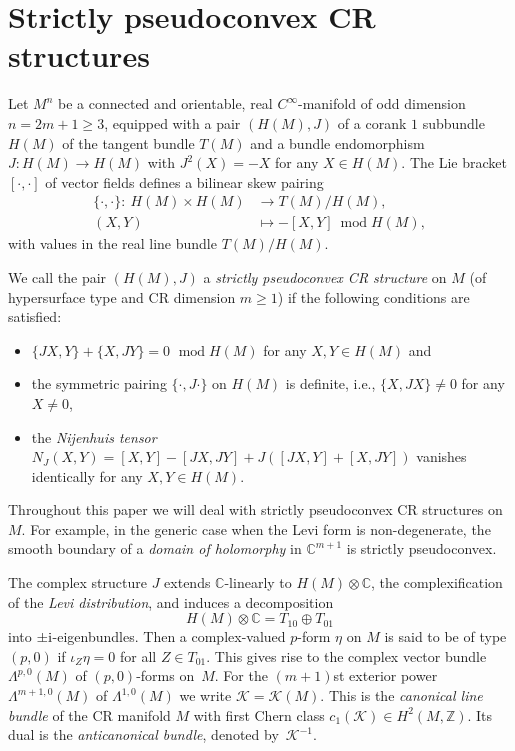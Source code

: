 \documentclass[pdftex]{sigma}
\numberwithin{equation}{section}
\newcommand{\ZZ}{\mathbb{Z}}
\newcommand{\CC}{\mathbb{C}}
\begin{document}
\section{Strictly pseudoconvex CR structures} \label{Sec2}

Let $M^n$ be a connected and orientable, real $C^\infty$-manifold of odd dimension $n=2m+1\geq 3$, equipped with a pair $(H(M),J)$
of a corank $1$ subbundle $H(M)$ of the tangent bundle $T(M)$ and a bundle endomorphism $J\colon H(M)\to H(M)$
with $J^2(X)=-X$ for any $X\in H(M)$. The Lie bracket $[\cdot,\cdot]$ of vector fields defines a bilinear skew pairing
\begin{align*}\{\cdot,\cdot\}\colon \ H(M)\times H(M) &\to T(M)/H(M),\\
 (X,Y)&\mapsto -[X,Y]\ \operatorname{mod} H(M),
\end{align*}
with values in the real line bundle $T(M)/H(M)$.

We call the pair $(H(M),J)$ a {\em strictly pseudoconvex CR structure} on $M$ (of hypersurface type and CR dimension $m\geq 1$)
if the following conditions are satisfied:
\begin{itemize}\itemsep=0pt
\item $\{JX,Y\}+\{X,JY\}=0$ $\operatorname{mod} H(M)$ for any $X,Y\in H(M)$ and
\item the symmetric pairing $\{\cdot,J\cdot\}$ on $H(M)$ is definite, i.e., $\{X,JX\}\neq 0$ for any $X\neq 0$,
\item the {\em Nijenhuis tensor} $N_J(X,Y)= [X,Y]-[JX,JY]+J([JX,Y]+[X,JY])$ vanishes identically for any $X,Y\in H(M)$.
\end{itemize}
Throughout this paper we will deal with strictly pseudoconvex CR structures on $M$.
For example, in the generic case when the Levi form is non-degenerate,
the smooth boundary of a {\em domain of holomorphy} in $\CC^{m+1}$ is strictly pseudoconvex.

The complex structure $J$ extends $\CC$-linearly to $H(M)\otimes\CC$, the complexification of the {\em Levi distribution}, and induces a decomposition
\[
H(M)\otimes\CC = T_{10}\oplus T_{01}
\]
into $\pm {\rm i}$-eigenbundles. Then a complex-valued $p$-form $\eta$ on $M$ is said to be of type $(p,0)$ if $\iota_Z\eta=0$ for all $Z\in T_{01}$.
This gives rise to the complex vector bundle $\Lambda^{p,0}(M)$ of $(p,0)$-forms on~$M$.
For the $(m+1)$st exterior power $\Lambda^{m+1,0}(M)$ of $\Lambda^{1,0}(M)$ we write $\mathcal{K}=\mathcal{K}(M)$.
This is the {\em canonical line bundle} of the CR manifold $M$ with first Chern class $c_1(\mathcal{K})\in H^2(M,\ZZ)$.
Its dual is the {\em anticanonical bundle}, denoted by~$\mathcal{K}^{-1}$.
\end{document}
